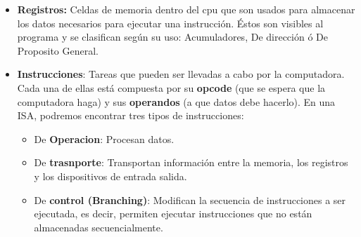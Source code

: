 \begin{itemize}
	\item \textbf{Registros:} Celdas de memoria dentro del cpu que son usados para almacenar los datos necesarios para ejecutar una instrucción. Éstos son visibles al programa y se clasifican según su uso: Acumuladores, De dirección ó De Proposito General.
	\item  \textbf{Instrucciones}: Tareas que pueden ser llevadas a cabo por la computadora. Cada una de ellas está compuesta por su \textbf{opcode} (que se espera que la computadora haga) y sus \textbf{operandos} (a que datos debe hacerlo). En una ISA, podremos encontrar tres tipos de instrucciones:
	\begin{itemize}
		\item De \textbf{Operacion}: Procesan datos.
		\item De \textbf{trasnporte}: Transportan información entre la memoria, los registros y los dispositivos de entrada salida.
		\item De \textbf{control (Branching)}: Modifican la secuencia de instrucciones a ser ejecutada, es decir, permiten ejecutar instrucciones que no están almacenadas secuencialmente.
	\end{itemize}
	

\end{itemize}
